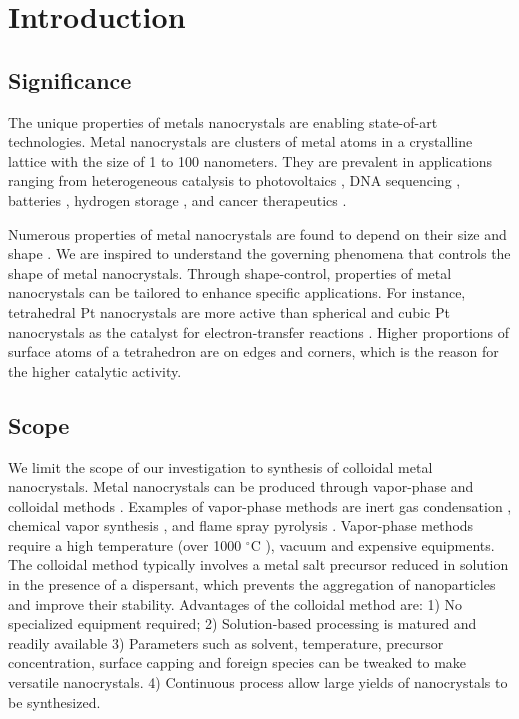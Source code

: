 \section{Introduction}

\subsection{Significance}

The unique properties of metals nanocrystals are enabling state-of-art technologies.
Metal nanocrystals are clusters of metal atoms in a crystalline lattice with the size of 1 to 100 nanometers.
They are prevalent in applications ranging from heterogeneous catalysis \cite{astruc2008nanoparticles,Astruc_2006} to photovoltaics \cite{Atwater_2010}, DNA sequencing \cite{McNally_2010}, batteries \cite{Panniello_2014}, hydrogen storage \cite{Jena_2011,Ramos_Castillo_2015}, and cancer therapeutics \cite{Jain_2010,Kim_2010}.

Numerous properties of metal nanocrystals are found to depend on their size \cite{Roduner_2006} and shape \cite{Xia_2008}.
We are inspired to understand the governing phenomena that controls the shape of metal nanocrystals.
Through shape-control, properties of metal nanocrystals can be tailored to enhance specific applications.
For instance, tetrahedral Pt nanocrystals are more active than spherical and cubic Pt nanocrystals as the catalyst for electron-transfer reactions \cite{Narayanan_2005}.
Higher proportions of surface atoms of a tetrahedron are on edges and corners, which is the reason for the higher catalytic activity.

\subsection{Scope}

We limit the scope of our investigation to synthesis of colloidal metal nanocrystals.
Metal nanocrystals can be produced through vapor-phase \cite{Swihart_2003} and colloidal methods \cite{Tao_2008}. Examples of vapor-phase methods are inert gas condensation \cite{Wegner_2002,Simchi_2007}, chemical vapor synthesis \cite{Lee_2012,Ostraat_2001}, and flame spray pyrolysis \cite{Teoh_2010}. 
Vapor-phase methods require a high temperature (over 1000 $^{\circ}$C \cite{Smetana_2005}), vacuum and expensive equipments.
The colloidal method typically involves a metal salt precursor reduced in solution in the presence of a dispersant, which prevents the aggregation of nanoparticles and improve their stability.
Advantages of the colloidal method are: 
1) No specialized equipment required; 
2) Solution-based processing is matured and readily available
3) Parameters such as solvent, temperature, precursor concentration, surface capping and foreign species can be tweaked to make versatile nanocrystals.
4) Continuous process allow large yields of nanocrystals to be synthesized.

